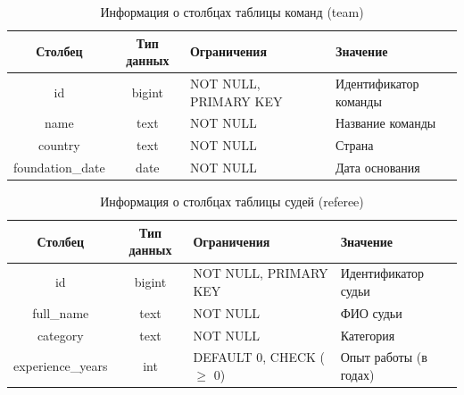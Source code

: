 \begin{table}[H]
	\begin{center}
		\caption{Информация о столбцах таблицы команд (team)}
		\begin{tabular}{|c|c|>{\centering\arraybackslash}m{5cm}|>{\centering\arraybackslash}m{3.5cm}|}
			\hline
			Столбец & Тип данных & Ограничения & Значение \\
			\hline
			id & bigint & NOT NULL, PRIMARY KEY & Идентификатор команды \\
			\hline
			name & text & NOT NULL & Название команды \\
			\hline
			country & text & NOT NULL & Страна \\
			\hline
			foundation\_date & date & NOT NULL & Дата основания \\
			\hline
		\end{tabular}
		\label{table:db:team}
	\end{center}
\end{table}

\begin{table}[H]
	\begin{center}
		\caption{Информация о столбцах таблицы судей (referee)}
		\begin{tabular}{|c|c|>{\centering\arraybackslash}m{5cm}|>{\centering\arraybackslash}m{3.5cm}|}
			\hline
			Столбец & Тип данных & Ограничения & Значение \\
			\hline
			id & bigint & NOT NULL, PRIMARY KEY & Идентификатор судьи \\
			\hline
			full\_name & text & NOT NULL & ФИО судьи \\
			\hline
			category & text & NOT NULL & Категория \\
			\hline
			experience\_years & int & DEFAULT 0, CHECK ($\ge$ 0) & Опыт работы (в годах) \\
			\hline
		\end{tabular}
		\label{table:db:referee}
	\end{center}
\end{table}

